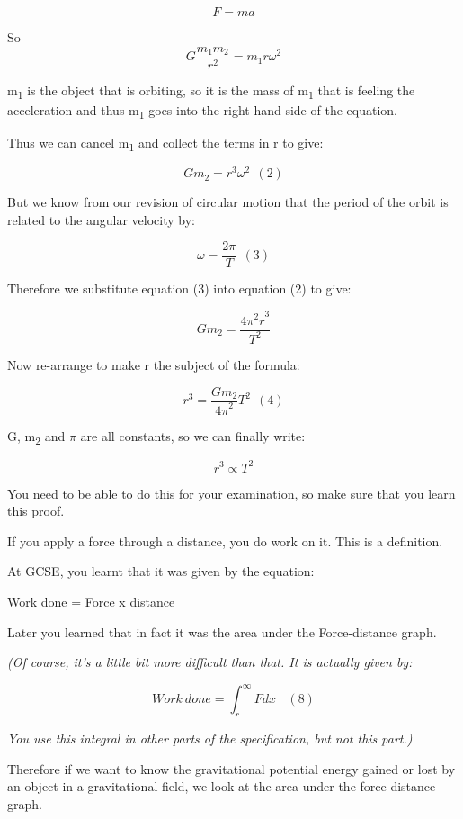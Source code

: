\documentclass[revision-guide.tex]{subfiles}
\begin{document}
\[F = ma\]

So \[G\frac{m_{1}m_{2}}{r^{2}} = m_{1}r\omega^{2}\]

m\textsubscript{1} is the object that is orbiting, so it is the mass of
m\textsubscript{1} that is feeling the acceleration and thus
m\textsubscript{1} goes into the right hand side of the equation.

Thus we can cancel m\textsubscript{1} and collect the terms in r to
give:

\[Gm_{2} = r^{3}\omega^{2}\ \ (2)\]

But we know from our revision of circular motion that the period of the
orbit is related to the angular velocity by:

\[\omega = \frac{2\pi}{T}\ \ (3)\]

Therefore we substitute equation (3) into equation (2) to give:

\[Gm_{2} = \frac{{4\pi^{2}r}^{3}}{T^{2}}\]

Now re-arrange to make r the subject of the formula:

\[r^{3} = \frac{Gm_{2}}{{4\pi}^{2}}T^{2}\ \ (4)\]

G, m\textsubscript{2} and $\pi$ are all constants, so we can finally write:

\[r^{3} \propto T^{2}\]

You need to be able to do this for your examination, so make sure that
you learn this proof.


If you apply a force through a distance, you do work on it. This is a definition.

At GCSE, you learnt that it was given by the equation:

Work done = Force x distance

Later you learned that in fact it was the area under the Force-distance
graph.

\emph{(Of course, it's a little bit more difficult than that. It is
actually given by:}

\[Work\ done = \int_{r}^{\infty}{F{dx\ \ \ \ (8)}}\]

\emph{You use this integral in other parts of the specification, but not
this part.)}

Therefore if we want to know the gravitational potential energy gained
or lost by an object in a gravitational field, we look at the area under
the force-distance graph.
\end{document}

